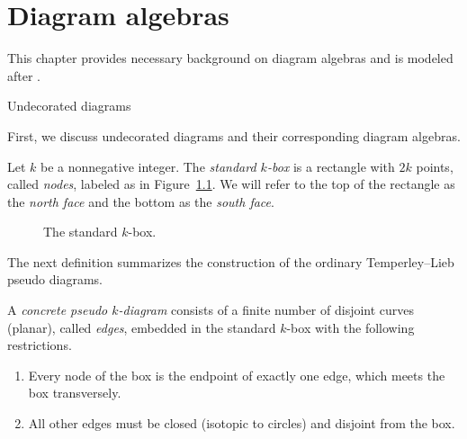 \chapter{Diagram algebras}\label{ch:diag}

This chapter provides necessary background on diagram algebras and is modeled after \cite{Ernst2012}.


\begin{section}{Undecorated diagrams}\label{undec}

First, we discuss undecorated diagrams and their corresponding diagram algebras.

\begin{definition}\label{def:k-box}
\rm Let $k$ be a nonnegative integer.  The \emph{standard $k$-box} is a rectangle with $2k$ points, called \emph{nodes},  labeled as in Figure~\ref{Fig073}.  We will refer to the top of the rectangle as the \emph{north face} and the bottom as the \emph{south face}.
\end{definition}


\begin{figure}[!ht]
\centering
{}
\caption{The standard $k$-box.}\label{Fig073}
\end{figure}

The next definition summarizes the construction of the ordinary Temperley--Lieb pseudo diagrams.  

\begin{definition}\label{def:T_k(emptyset)}
\rm A \emph{concrete pseudo $k$-diagram} consists of a finite number of disjoint curves (planar), called \emph{edges}, embedded in the standard $k$-box with the following restrictions.  
\begin{enumerate}[leftmargin=0.6in]
\item Every node of the box is the endpoint of exactly one edge, which meets the box transversely. 
\item All other edges must be closed (isotopic to circles) and disjoint from the box. 
\end{enumerate}
\end{definition}



\end{section}
